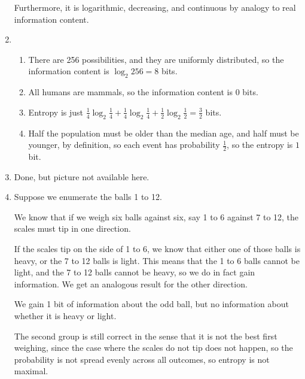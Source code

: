 \begin{enumerate}
            Furthermore, it is logarithmic, decreasing, and continuous by analogy to real information content.

            \item
              \begin{enumerate}
                  \item
                    There are 256 possibilities, and they are uniformly distributed, so the information content is $\log_2 256 = 8$ bits.

                    \item
                      All humans are mammals, so the information content is 0 bits.

                      \item
                        Entropy is just $\frac{1}{4}\log_2 \frac{1}{4} + \frac{1}{4}\log_2 \frac{1}{4} + \frac{1}{2}\log_2 \frac{1}{2} = \frac{3}{2}$ bits.

                        \item
                          Half the population must be older than the median age, and half must be younger, by definition, so each event has probability $\frac{1}{2}$, so the entropy is $1$ bit.
              \end{enumerate}

              \item

                Done, but picture not available here.

                \item

                  Suppose we enumerate the balls 1 to 12.

                  We know that if we weigh six balls against six, say 1 to 6 against 7 to 12, the scales must tip in one direction.

                  If the scales tip on the side of 1 to 6, we know that either one of those balls is heavy, or the 7 to 12 balls is light. This means that the 1 to 6 balls cannot be light, and the 7 to 12 balls cannot be heavy, so we do in fact gain information. We get an analogous result for the other direction.

                  We gain 1 bit of information about the odd ball, but no information about whether it is heavy or light.

                  The second group is still correct in the sense that it is not the best first weighing, since the case where the scales do not tip does not happen, so the probability is not spread evenly across all outcomes, so entropy is not maximal.


\end{enumerate}

